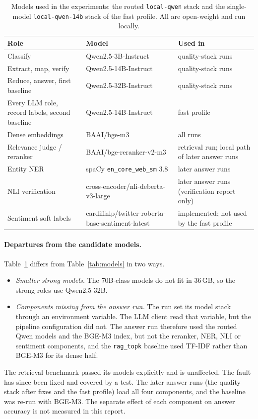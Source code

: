 \documentclass[11pt,letterpaper,oneside]{report}
\begin{document}
\begin{table}[htbp]
\centering\small
\caption[Models used in the experiments]{Models used in the experiments: the routed \texttt{local-qwen}
stack and the single-model \texttt{local-qwen-14b} stack of the fast
profile. All are open-weight and run locally.}
\label{tab:used-models}
\begin{tabularx}{\textwidth}{@{}>{\raggedright\arraybackslash}p{4.2cm} >{\raggedright\arraybackslash}X >{\raggedright\arraybackslash}p{3.6cm}@{}}
\toprule
Role & Model & Used in \\
\midrule
Classify & Qwen2.5-3B-Instruct & quality-stack runs \\
Extract, map, verify & Qwen2.5-14B-Instruct & quality-stack runs \\
Reduce, answer, first baseline & Qwen2.5-32B-Instruct & quality-stack runs \\
Every LLM role, record labels, second baseline & Qwen2.5-14B-Instruct & fast profile \\
Dense embeddings & BAAI/bge-m3 & all runs \\
Relevance judge / reranker & BAAI/bge-reranker-v2-m3 & retrieval run; local path of later answer runs \\
Entity NER & spaCy \texttt{en\_core\_web\_sm} 3.8 & later answer runs \\
NLI verification & cross-encoder/nli-deberta-v3-large & later answer runs (verification report only) \\
Sentiment soft labels & cardiffnlp/twitter-roberta-base-sentiment-latest & implemented; not used by the fast profile \\
\bottomrule
\end{tabularx}
\end{table}

\paragraph{Departures from the candidate models.}
Table~\ref{tab:used-models} differs from Table~\ref{tab:models} in two ways.
\begin{itemize}
  \item \emph{Smaller strong models.} The 70B-class models do not fit in
  36\,GB, so the strong roles use Qwen2.5-32B.
  \item \emph{Components missing from the answer run.} The run set its model
  stack through an environment variable. The LLM client read that variable,
  but the pipeline configuration did not. The answer run therefore used the
  routed Qwen models and the BGE-M3 index, but not the reranker, NER, NLI or
  sentiment components, and the \texttt{rag\_topk} baseline used TF-IDF
  rather than BGE-M3 for its dense half.
\end{itemize}
The retrieval benchmark passed its models explicitly and is unaffected. The
fault has since been fixed and covered by a test. The later answer runs (the
quality stack after fixes and the fast profile) load all four components,
and the baseline was re-run with BGE-M3. The separate effect of each
component on answer accuracy is not measured in this report.
\end{document}

